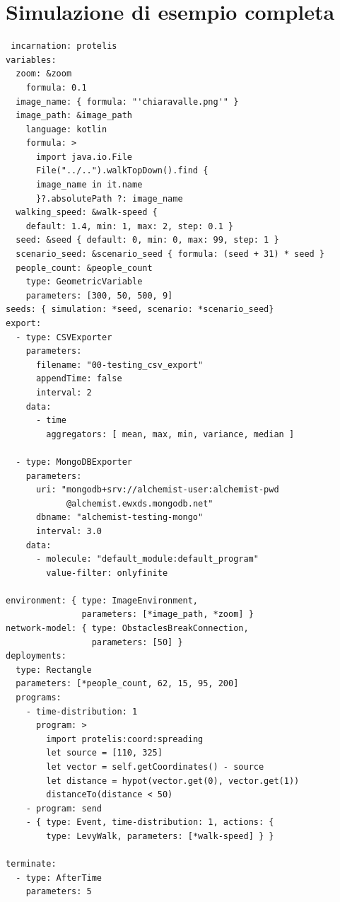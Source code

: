 \documentclass[12pt,a4paper,openright,oneside]{book}
\begin{document}
\section{Simulazione di esempio completa}
 \begin{verbatim}
 incarnation: protelis
variables:
  zoom: &zoom
    formula: 0.1
  image_name: { formula: "'chiaravalle.png'" }
  image_path: &image_path
    language: kotlin
    formula: >
      import java.io.File
      File("../..").walkTopDown().find { 
      image_name in it.name
      }?.absolutePath ?: image_name
  walking_speed: &walk-speed { 
    default: 1.4, min: 1, max: 2, step: 0.1 }
  seed: &seed { default: 0, min: 0, max: 99, step: 1 }
  scenario_seed: &scenario_seed { formula: (seed + 31) * seed }
  people_count: &people_count
    type: GeometricVariable
    parameters: [300, 50, 500, 9]
seeds: { simulation: *seed, scenario: *scenario_seed}
export:
  - type: CSVExporter
    parameters: 
      filename: "00-testing_csv_export"
      appendTime: false
      interval: 2
    data:
      - time
        aggregators: [ mean, max, min, variance, median ]

  - type: MongoDBExporter
    parameters:
      uri: "mongodb+srv://alchemist-user:alchemist-pwd
            @alchemist.ewxds.mongodb.net"
      dbname: "alchemist-testing-mongo"
      interval: 3.0
    data:
      - molecule: "default_module:default_program"
        value-filter: onlyfinite      
        
environment: { type: ImageEnvironment,
               parameters: [*image_path, *zoom] }
network-model: { type: ObstaclesBreakConnection,
                 parameters: [50] }
deployments:
  type: Rectangle
  parameters: [*people_count, 62, 15, 95, 200]
  programs:
    - time-distribution: 1
      program: >
        import protelis:coord:spreading
        let source = [110, 325]
        let vector = self.getCoordinates() - source
        let distance = hypot(vector.get(0), vector.get(1))
        distanceTo(distance < 50)
    - program: send
    - { type: Event, time-distribution: 1, actions: { 
        type: LevyWalk, parameters: [*walk-speed] } }

terminate:
  - type: AfterTime
    parameters: 5
\end{verbatim}
\end{document}
